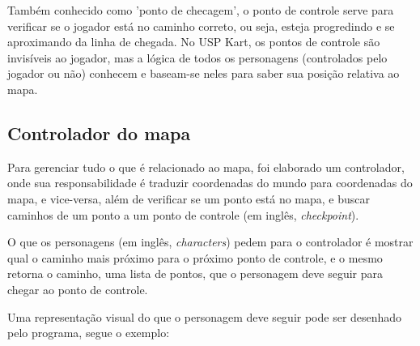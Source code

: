Também conhecido como 'ponto de checagem', o ponto de controle serve para verificar se o jogador está no caminho correto, ou seja, esteja progredindo e se aproximando da linha de chegada. No USP Kart, os pontos de controle são invisíveis ao jogador, mas a lógica de todos os personagens (controlados pelo jogador ou não) conhecem e baseam-se neles para saber sua posição relativa ao mapa.

\subsection{Controlador do mapa}

Para gerenciar tudo o que é relacionado ao mapa, foi elaborado um controlador, onde sua responsabilidade é traduzir coordenadas do mundo para coordenadas do mapa, e vice-versa, além de verificar se um ponto está no mapa, e buscar caminhos de um ponto a um ponto de controle (em inglês, \textit{checkpoint}).

O que os personagens (em inglês, \textit{characters}) pedem para o controlador é mostrar qual o caminho mais próximo para o próximo ponto de controle, e o mesmo retorna o caminho, uma lista de pontos, que o personagem deve seguir para chegar ao ponto de controle.

Uma representação visual do que o personagem deve seguir pode ser desenhado pelo programa, segue o exemplo:


